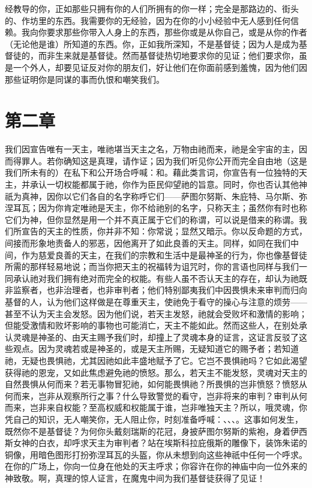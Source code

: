经教导的你，正如那些只拥有你的人们所拥有的你一样；完全是那路边的、街头的、作坊里的东西。我需要你的无经验，因为在你的小小经验中无人感到任何信赖。我向你要求那些你带入人身上的东西，那些你或是从你自己，或是从你的作者（无论他是谁）所知道的东西。你，正如我所深知，不是基督徒；因为人是成为基督徒的，而非生来就是基督徒。然而基督徒热切地要求你的见证；他们要求你，虽是一个外人，却要见证反对你的朋友们，好让他们在你面前感到羞愧，因为他们因那些证明你是同谋的事而仇恨和嘲笑我们。\par


\section{第二章}

我们因宣告唯有一天主，唯祂堪当天主之名，万物由祂而来，祂是全宇宙的主，因而得罪人。若你确知这是真理，请作证；因为我们听见你公开而完全自由地（这是我们所未有的）在私下和公开场合呼喊：和。藉此类言词，你宣告有一位独特的天主，并承认一切权能都属于祂，你作为臣民仰望祂的旨意。同时，你也否认其他神祇为真神，因你以它们各自的名字称呼它们——萨图尔努斯、朱庇特、马尔斯、弥涅耳瓦；因为你肯定唯祂是天主，你不给祂别的名字，只称天主；虽然你有时也称它们为神，但你显然是用一个并不真正属于它们的称谓，可以说是借来的称谓。我们所宣告的天主的性质，你并非不知：你常说；显然又暗示。你以反命题的方式，间接而形象地责备人的邪恶，因他离开了如此良善的天主。同样，如同在我们中间，作为慈爱良善的天主，在我们的宗教和生活中是最神圣的行为，你也像基督徒所需的那样轻易地说；而当你把天主的祝福转为诅咒时，你的言语也同样与我们一同承认祂对我们拥有绝对而完全的权能。有些人虽不否认天主的存在，却认为祂既非监察者，也非治理者，也非审判者；他们特别鄙夷我们中因畏惧未来审判而归向基督的人，认为他们这样做是在尊重天主，使祂免于看守的操心与注意的烦劳——甚至不认为天主会发怒。因为他们说，若天主发怒，祂就会受败坏和激情的影响；但能受激情和败坏影响的事物也可能消亡，天主不能如此。然而这些人，在别处承认灵魂是神圣的、由天主赐予我们时，却撞上了灵魂本身的证言，这证言反驳了这些观点。因为灵魂若或是神圣的，或是天主所赐，无疑知道它的赐予者；若知道祂，无疑也畏惧祂，尤其因祂如此丰盛地赋予了它。它岂不畏惧祂吗？它如此渴望获得祂的恩宠，又如此焦虑避免祂的愤怒。那么，若天主不能发怒，灵魂对天主的自然畏惧从何而来？若无事物冒犯祂，如何能畏惧祂？所畏惧的岂非愤怒？愤怒从何而来，岂非从观察所行之事？什么导致警觉的看守，岂非将来的审判？审判从何而来，岂非来自权能？至高权威和权能属于谁，岂非唯独天主？所以，哦灵魂，你凭自己的知识，无人嘲笑你，无人阻止你，时刻准备呼喊：、、、。这事如何发生，既然你不是基督徒？为何你头戴刻瑞斯的花冠，身披萨图尔努斯的紫袍，身着伊西斯女神的白衣，却呼求天主为审判者？站在埃斯科拉庇俄斯的雕像下，装饰朱诺的铜像，用暗色图形打扮弥涅耳瓦的头盔，你从未想到向这些神祇中任何一个呼求。在你的广场上，你向一位身在他处的天主呼求；你容许在你的神庙中向一位外来的神致敬。啊，真理的惊人证言，在魔鬼中间为我们基督徒获得了见证！\par

